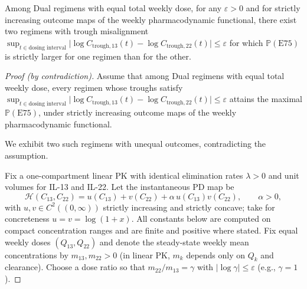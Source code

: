 ﻿\begin{theorem}\label{thm:trough-nonidentifiability}
Among Dual regimens with equal total weekly dose, for any $\varepsilon>0$ and for strictly increasing outcome maps of the weekly pharmacodynamic functional, there exist two regimens with trough misalignment $\sup_{t\in\text{dosing interval}}\big|\log C_{\mathrm{trough},13}(t)-\log C_{\mathrm{trough},22}(t)\big|\le\varepsilon$ for which $\mathbb P(\mathrm{E75})$ is strictly larger for one regimen than for the other.
\end{theorem}

\begin{proof}[Proof (by contradiction)]
Assume that among Dual regimens with equal total weekly dose, every regimen whose troughs satisfy $\sup_{t\in\text{dosing interval}}\big|\log C_{\mathrm{trough},13}(t)-\log C_{\mathrm{trough},22}(t)\big|\le\varepsilon$ attains the maximal $\mathbb P(\mathrm{E75})$, under strictly increasing outcome maps of the weekly pharmacodynamic functional.

We exhibit two such regimens with unequal outcomes, contradicting the assumption.

Fix a one-compartment linear PK with identical elimination rates $\lambda>0$ and unit volumes for IL-13 and IL-22. Let the instantaneous PD map be
$$\mathcal H(C_{13},C_{22})=u(C_{13})+v(C_{22})+\alpha\,u(C_{13})v(C_{22}),\qquad \alpha>0,$$
with $u,v\in C^2((0,\infty))$ strictly increasing and strictly concave; take for concreteness $u=v=\log(1+x)$. All constants below are computed on compact concentration ranges and are finite and positive where stated. Fix equal weekly doses $(Q_{13},Q_{22})$ and denote the steady-state weekly mean concentrations by $m_{13},m_{22}>0$ (in linear PK, $m_k$ depends only on $Q_k$ and clearance). Choose a dose ratio so that $m_{22}/m_{13}=\gamma$ with $|\log\gamma|\le\varepsilon$ (e.g., $\gamma=1$).


\end{proof}
